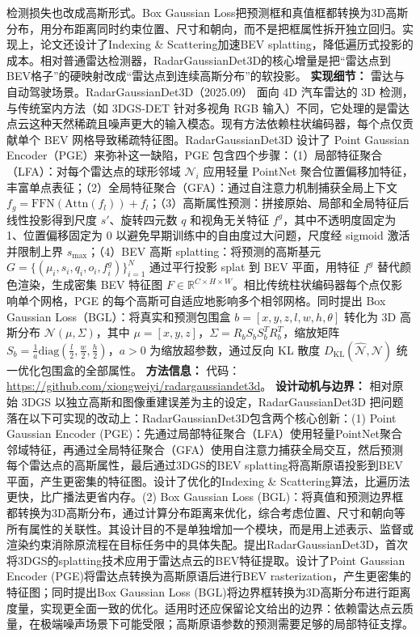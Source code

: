 检测损失也改成高斯形式。Box Gaussian Loss把预测框和真值框都转换为3D高斯分布，用分布距离同时约束位置、尺寸和朝向，而不是把框属性拆开独立回归。实现上，论文还设计了Indexing \& Scattering加速BEV splatting，降低遍历式投影的成本。相对普通雷达检测器，RadarGaussianDet3D的核心增量是把“雷达点到BEV格子”的硬映射改成“雷达点到连续高斯分布”的软投影。
\textbf{实现细节：} 雷达与自动驾驶场景。RadarGaussianDet3D（2025.09） 面向 4D 汽车雷达的 3D 检测，与传统室内方法（如 3DGS-DET 针对多视角 RGB 输入）不同，它处理的是雷达点云这种天然稀疏且噪声更大的输入模态。现有方法依赖柱状编码器，每个点仅贡献单个 BEV 网格导致稀疏特征图。RadarGaussianDet3D 设计了 Point Gaussian Encoder（PGE）来弥补这一缺陷，PGE 包含四个步骤：（1）局部特征聚合（LFA）：对每个雷达点的球形邻域 $\mathcal{N}_i$ 应用轻量 PointNet 聚合位置偏移加特征，丰富单点表征；（2）全局特征聚合（GFA）：通过自注意力机制捕获全局上下文 $f_g = \mathrm{FFN}(\mathrm{Attn}(f_l)) + f_l$；（3）高斯属性预测：拼接原始、局部和全局特征后线性投影得到尺度 $s'$、旋转四元数 $q$ 和视角无关特征 $f^g$，其中不透明度固定为 1、位置偏移固定为 0 以避免早期训练中的自由度过大问题，尺度经 sigmoid 激活并限制上界 $s_\mathrm{max}$；（4）BEV 高斯 splatting：将预测的高斯基元 $G = \{(\mu_i, s_i, q_i, o_i, f^g_i)\}_{i=1}^N$ 通过平行投影 splat 到 BEV 平面，用特征 $f^g$ 替代颜色渲染，生成密集 BEV 特征图 $F \in \mathbb{R}^{C \times H \times W}$。相比传统柱状编码器每个点仅影响单个网格，PGE 的每个高斯可自适应地影响多个相邻网格。同时提出 Box Gaussian Loss（BGL）：将真实和预测包围盒 $b = [x, y, z, l, w, h, \theta]$ 转化为 3D 高斯分布 $\mathcal{N}(\mu, \Sigma)$，其中 $\mu = [x,y,z]$，$\Sigma = R_b S_b S_b^T R_b^T$，缩放矩阵 $S_b = \frac{1}{a}\mathrm{diag}(\frac{l}{2}, \frac{w}{2}, \frac{h}{2})$，$a > 0$ 为缩放超参数，通过反向 KL 散度 $D_{\mathrm{KL}}(\hat{\mathcal{N}}, \mathcal{N})$ 统一优化包围盒的全部属性。
\textbf{方法信息：} 代码：\url{https://github.com/xiongweiyi/radargaussiandet3d}。
\textbf{设计动机与边界：} 相对原始 3DGS 以独立高斯和图像重建误差为主的设定，RadarGaussianDet3D 把问题落在以下可实现的改动上：RadarGaussianDet3D包含两个核心创新：(1) Point Gaussian Encoder (PGE)：先通过局部特征聚合（LFA）使用轻量PointNet聚合邻域特征，再通过全局特征聚合（GFA）使用自注意力捕获全局交互，然后预测每个雷达点的高斯属性，最后通过3DGS的BEV splatting将高斯原语投影到BEV平面，产生更密集的特征图。设计了优化的Indexing \& Scattering算法，比遍历法更快，比广播法更省内存。(2) Box Gaussian Loss (BGL)：将真值和预测边界框都转换为3D高斯分布，通过计算分布距离来优化，综合考虑位置、尺寸和朝向等所有属性的关联性。其设计目的不是单独增加一个模块，而是用上述表示、监督或渲染约束消除原流程在目标任务中的具体失配。提出RadarGaussianDet3D，首次将3DGS的splatting技术应用于雷达点云的BEV特征提取。设计了Point Gaussian Encoder (PGE)将雷达点转换为高斯原语后进行BEV rasterization，产生更密集的特征图；同时提出Box Gaussian Loss (BGL)将边界框转换为3D高斯分布进行距离度量，实现更全面一致的优化。适用时还应保留论文给出的边界：依赖雷达点云质量，在极端噪声场景下可能受限；高斯原语参数的预测需要足够的局部特征支撑。

